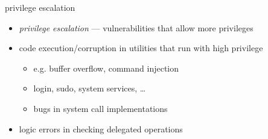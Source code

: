 \begin{frame}{privilege escalation}
\begin{itemize}
\item \textit{privilege escalation} --- vulnerabilities that allow more privileges
\vspace{.5cm}
\item code execution/corruption in utilities that run with high privilege
    \begin{itemize}
    \item e.g. buffer overflow, command injection
    \vspace{.5cm}
    \item login, sudo, system services, \ldots
    \item bugs in system call implementations
    \end{itemize}
\item logic errors in checking delegated operations
\end{itemize}
\end{frame}
